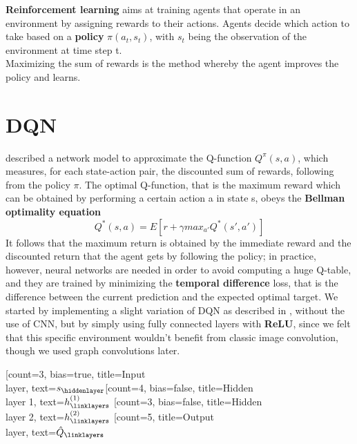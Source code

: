 \textbf{Reinforcement learning} aims at training agents that operate in an environment by assigning rewards to their actions. Agents decide which action to take based on a \textbf{policy} $\pi(a_t, s_t)$, with $s_t$ being the observation of the environment at time step t. \\
Maximizing the sum of rewards is the method whereby the agent improves the policy and learns.

\section{DQN}
\cite{dqn} described a network model to approximate the Q-function $Q^{\pi}(s,a)$, which measures, for each state-action pair, the discounted sum of rewards, following from the policy $\pi$. The optimal Q-function, that is the maximum reward which can be obtained by performing a certain action a in state s, obeys the \textbf{Bellman optimality equation} $$Q^*(s,a) = E[r + \gamma max_{a'}Q^*(s', a')]$$
It follows that the maximum return is obtained by the immediate reward and the discounted return that the agent gets by following the policy; in practice, however, neural networks are needed in order to avoid computing a huge Q-table, and they are trained by minimizing the \textbf{temporal difference} loss, that is the difference between the current prediction and the expected optimal target.  
We started by implementing a slight variation of DQN as described in \cite{dqn}, without the use of CNN, but by simply using fully connected layers with \textbf{ReLU}, since we felt that this specific environment wouldn't benefit from classic image convolution, though we used graph convolutions later. \\
\begin{center}
\begin{neuralnetwork} [nodespacing=10mm, layerspacing=25mm,
			maintitleheight=2.5em, layertitleheight=2.5em,
			height=5, toprow=false, nodesize=17pt, style={},
			title={}, titlestyle={}]
		        \newcommand{\x}[2]{$s_#2$}
		        \newcommand{\y}[2]{$\hat{Q}_#2$}
		        \newcommand{\hfirst}[2]{\small $h^{(1)}_#2$}
		        \newcommand{\hsecond}[2]{\small $h^{(2)}_#2$}
		        [count=3, bias=true, title=Input\\layer, text=\x]
		        \hiddenlayer[count=4, bias=false, title=Hidden\\layer 1, text=\hfirst] \linklayers
		        \hiddenlayer[count=3, bias=false, title=Hidden\\layer 2, text=\hsecond] \linklayers
		        \outputlayer[count=5, title=Output\\layer, text=\y] \linklayers
\end{neuralnetwork}
\end{center}
	
